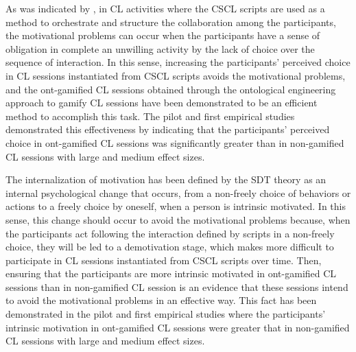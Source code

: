 As was indicated by , in CL activities where the CSCL scripts are used as a method to orchestrate and structure the collaboration among the participants, the motivational problems can occur when the participants have a sense of obligation in complete an unwilling activity by the lack of choice over the sequence of interaction. In this sense, increasing the participants' perceived choice in CL sessions instantiated from CSCL scripts avoids the motivational problems, and the ont-gamified CL sessions obtained through the ontological engineering approach to gamify CL sessions have been demonstrated to be an efficient method to accomplish this task. The pilot and first empirical studies demonstrated this effectiveness by indicating that the participants' perceived choice in ont-gamified CL sessions was significantly greater than in non-gamified CL sessions with large and medium effect sizes. 

The internalization of motivation has been defined by the SDT theory \cite{RyanDeci2000} as an internal psychological change that occurs, from a non-freely choice of behaviors or actions to a freely choice by oneself, when a person is intrinsic motivated. In this sense, this change should occur to avoid the motivational problems because, when the participants act following the interaction defined by scripts in a non-freely choice, they will be led to a demotivation stage, which makes more difficult to participate in CL sessions instantiated from CSCL scripts over time. Then, ensuring that the participants are more intrinsic motivated in ont-gamified CL sessions than in non-gamified CL session is an evidence that these sessions intend to avoid the motivational problems in an effective way. This fact has been demonstrated in the pilot and first empirical studies where the participants' intrinsic motivation in ont-gamified CL sessions were greater that in non-gamified CL sessions with large and medium effect sizes. 

